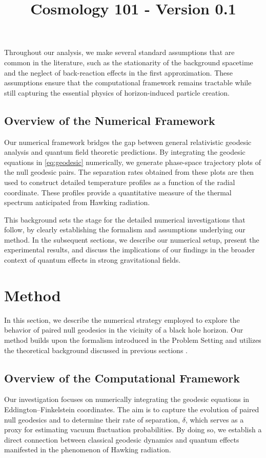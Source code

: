 \documentclass{article}\usepackage{graphicx} \usepackage{amsmath} \usepackage{colortbl}\title{Cosmology 101 - Version 0.1}
\begin{document}
Throughout our analysis, we make several standard assumptions that are common in the literature, such as the stationarity of the background spacetime and the neglect of back-reaction effects in the first approximation. These assumptions ensure that the computational framework remains tractable while still capturing the essential physics of horizon-induced particle creation.

\subsection{Overview of the Numerical Framework}
Our numerical framework bridges the gap between general relativistic geodesic analysis and quantum field theoretic predictions. By integrating the geodesic equations in \eqref{eq:geodesic} numerically, we generate phase-space trajectory plots of the null geodesic pairs. The separation rates obtained from these plots are then used to construct detailed temperature profiles as a function of the radial coordinate. These profiles provide a quantitative measure of the thermal spectrum anticipated from Hawking radiation.

This background sets the stage for the detailed numerical investigations that follow, by clearly establishing the formalism and assumptions underlying our method. In the subsequent sections, we describe our numerical setup, present the experimental results, and discuss the implications of our findings in the broader context of quantum effects in strong gravitational fields.\section{Method}
In this section, we describe the numerical strategy employed to explore the behavior of paired null geodesics in the vicinity of a black hole horizon. Our method builds upon the formalism introduced in the Problem Setting and utilizes the theoretical background discussed in previous sections \cite{Hawking1975 Jacobson1993 Unruh1976}. 

\subsection{Overview of the Computational Framework}
Our investigation focuses on numerically integrating the geodesic equations in Eddington–Finkelstein coordinates. The aim is to capture the evolution of paired null geodesics and to determine their rate of separation, $\delta$, which serves as a proxy for estimating vacuum fluctuation probabilities. By doing so, we establish a direct connection between classical geodesic dynamics and quantum effects manifested in the phenomenon of Hawking radiation.
\end{document}
